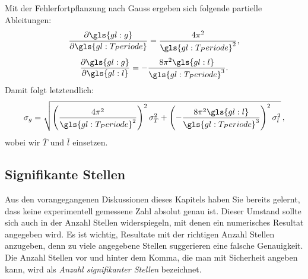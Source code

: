 Mit der Fehlerfortpflanzung nach Gauss ergeben sich folgende partielle Ableitungen:
\begin{align}
\frac{\partial \gls{gl:g}}{\partial \gls{gl:T_Periode}} =  \frac{4 \pi^2}{\gls{gl:T_Periode}^2},
\end{align}
\begin{align}
\frac{\partial \gls{gl:g}}{\partial \gls{gl:l}}  = - \frac{8 \pi^2 \gls{gl:l}}{\gls{gl:T_Periode}^3}.
\label{eq:vl3-7}
\end{align}
Damit folgt letztendlich:
\begin{align}
\sigma_g = \sqrt{ \left( \frac{4 \pi^2}{\gls{gl:T_Periode}^2} \right)^2 \sigma^2_T + \left( - \frac{8 \pi^2 \gls{gl:l}}{\gls{gl:T_Periode}^3} \right)^2 \sigma^2_l }\,,
\label{eq:vl3-8}
\end{align}
wobei wir $\overline{T}$ und $\overline{l}$ einsetzen.



\subsection{Signifikante Stellen}
Aus den vorangegangenen Diskussionen dieses Kapitels haben Sie bereits gelernt, dass keine experimentell gemessene Zahl absolut genau ist. Dieser Umstand sollte sich auch in der Anzahl Stellen widerspiegeln, mit denen ein numerisches Resultat angegeben wird. Es ist wichtig, Resultate mit der richtigen Anzahl Stellen anzugeben, denn zu viele angegebene Stellen suggerieren eine falsche Genauigkeit. Die Anzahl Stellen vor und hinter dem Komma, die man mit Sicherheit angeben kann, wird als \textit{Anzahl signifikanter Stellen} bezeichnet. \\

